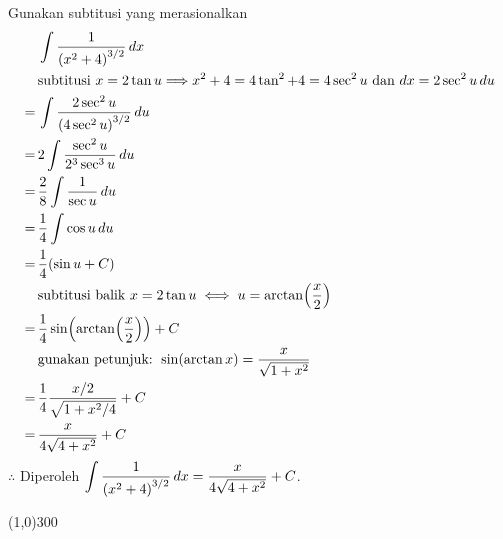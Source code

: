 \begin{enumerate}[leftmargin=*, label={\arabic*}.]
\begin{enumerate}[label={\alph*}.]
    Gunakan subtitusi yang merasionalkan
    \begin{align*}
        &\int \frac{1}{\brk*{x^{2}+4}^{3/2}}\,dx\\
        &\text{subtitusi $x=2\tan u \Longrightarrow x^2+4=4\tan^{2}+4=4\sec^{2}u$
        dan $dx=2\sec^{2}u\,du$}\\
        =\,&\int \frac{2\sec^{2}u}{\brk*{4\sec^{2}u}^{3/2}}\,du\\
        =\,&2\int\frac{\sec^{2}u}{2^{3}\sec^{3}u}\,du\\
        =\,&\frac{2}{8}\int\frac{1}{\sec u}\,du\\
        =\,&\frac{1}{4}\int\cos u\,du\\
        =\,&\frac{1}{4}\brk*{\sin u + C}\\
        &\text{subtitusi balik }x=2\tan u \iff u = \arctan\brk*{\frac{x}{2}}\\
        =\,&\frac{1}{4}\sin\brk*{\arctan\brk*{\frac{x}{2}}}+C\\
        &\text{gunakan petunjuk: }\sin(\arctan x) = \frac{x}{\sqrt{1+x^{2}}}\\
        =\,&\frac{1}{4}\frac{x/2}{\sqrt{1+x^{2}/4}}+C\\
        =\,&\frac{x}{4\sqrt{4+x^{2}}}+C
    \end{align*}
    $\therefore$ Diperoleh $\ds \int \frac{1}{\brk*{x^{2}+4}^{3/2}}\,dx 
    = \frac{x}{4\sqrt{4+x^{2}}}+C$.
\end{enumerate}
\end{enumerate}

\begin{center}
    \line(1,0){300}
\end{center}